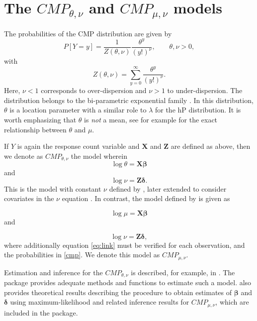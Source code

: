 \section{The $CMP_{\theta, \nu}$ and $CMP_{\mu, \nu}$ models}

The probabilities of the CMP distribution are given by
\begin{equation}
    P\left[Y = y \right] = \frac{1}{Z\left(\theta, \nu \right)} \frac{\theta^{y}} {\left(y!\right)^{\nu}}, \qquad \theta, \nu > 0, \label{cmp}
\end{equation}
with
\[
Z\left(\theta, \nu\right) = \sum_{y = 0}^{\infty} \frac{\theta^{y}}{\left(y!\right)^{\nu}}.
\]
Here, $\nu < 1$ corresponds to over-dispersion and $\nu > 1$ to under-dispersion. The distribution belongs to the bi-parametric exponential family \citep{huang}. In this distribution, $\theta$ is a location parameter with a similar role to $\lambda$ for the hP distribution. It is worth emphasizing that $\theta$ is \textit{not} a mean, see for example \citet{francis12} for the exact relationship between $ \theta $ and $ \mu $. 

If $Y$ is again the response count variable and $ \mathbf{X} $ and $ \mathbf{Z} $ are defined as above, then we denote as $CMP_{\theta, \nu}$ the model wherein
\[
\log \theta =  \mathbf{X} \boldsymbol{\beta}
\]
and
\[
\log \nu = \mathbf{Z} \boldsymbol{\delta}.
\]
This is the model with constant $\nu$ defined by \citet{sellers10}, later extended to consider covariates in the $\nu$ equation \citep{sellers12, CHATLA18}. In contrast, the model defined by \citet{huang} is given as

\[
\log \mu =  \mathbf{X} \boldsymbol{\beta}
\]
and

\[
\log \nu = \mathbf{Z} \boldsymbol{\delta},
\]
where additionally equation \eqref{eq:link} must be verified for each observation, and the probabilities in \eqref{cmp}. We denote this model as $CMP_{\mu, \nu}$.

Estimation and inference for the $CMP_{\theta, \nu}$ is described, for example, in \citet{sellers10}. The  package \citep{COMPoissonReg} provides adequate methods and functions to estimate such a model. \citet{huang} also provides theoretical results describing the procedure to obtain estimates of $\boldsymbol{\beta}$ and $\boldsymbol{\delta}$ using maximum-likelihood and related inference results for $CMP_{\mu, \nu}$, which are included in the  package.

